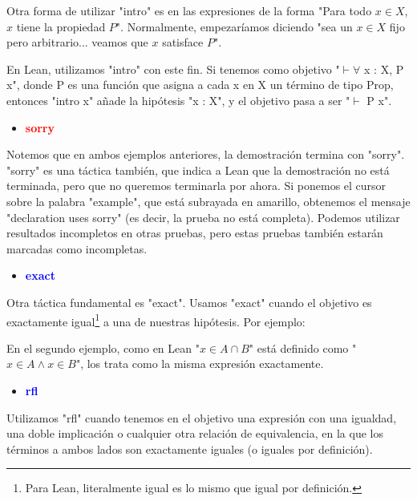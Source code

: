 \documentclass{article}
\begin{document}

Otra forma de utilizar "intro" es en las expresiones de la forma "Para todo $x \in X$, $x$ tiene la propiedad $P$". Normalmente, empezaríamos diciendo "sea un $x \in X$ fijo pero arbitrario... veamos que $x$ satisface $P$".

En Lean, utilizamos "intro" con este fin. Si tenemos como objetivo "$\vdash \forall$ x : X, P x", donde P es una función que asigna a cada x en X un término de tipo Prop, entonces "intro x" añade la hipótesis "x : X", y el objetivo pasa a ser "$\vdash$ P x".


\begin{itemize}
  \item \textbf{\textcolor{red}{sorry}}
\end{itemize}

Notemos que en ambos ejemplos anteriores, la demostración termina con "sorry". "sorry" es una táctica también, que indica a Lean que la demostración no está terminada, pero que no queremos terminarla por ahora. Si ponemos el cursor sobre la palabra "example", que está subrayada en amarillo, obtenemos el mensaje "declaration uses sorry" (es decir, la prueba no está completa). Podemos utilizar resultados incompletos en otras pruebas, pero estas pruebas también estarán marcadas como incompletas.

\begin{itemize}
  \item \textbf{\textcolor{blue}{exact}}
\end{itemize}

Otra táctica fundamental es "exact". Usamos "exact" cuando el objetivo es exactamente igual\footnote{Para Lean, literalmente igual es lo mismo que igual por definición.} a una de nuestras hipótesis. Por ejemplo:


En el segundo ejemplo, como en Lean "$x \in A \cap B$" está definido como "$x \in A \land x \in B$", los trata como la misma expresión exactamente.

\begin{itemize}
  \item \textbf{\textcolor{blue}{rfl}}
\end{itemize}

Utilizamos "rfl" cuando tenemos en el objetivo una expresión con una igualdad, una doble implicación o cualquier otra relación de equivalencia, en la que los términos a ambos lados son exactamente iguales (o iguales por definición).
\end{document}
